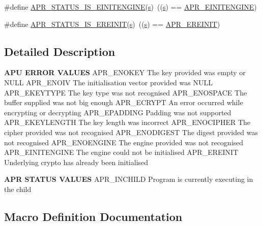 \begin{DoxyCompactItemize}
\item 
\#define \hyperlink{group__APR__Util__Error_ga0330ff3219d56b41f702364de38d2a18}{A\+P\+R\+\_\+\+S\+T\+A\+T\+U\+S\+\_\+\+I\+S\+\_\+\+E\+I\+N\+I\+T\+E\+N\+G\+I\+NE}(\hyperlink{pcretest_8txt_a062597889ba244b72877454b1d3adecf}{s})~((\hyperlink{pcretest_8txt_a062597889ba244b72877454b1d3adecf}{s}) == \hyperlink{group__APR__Util__Error_ga9d8482ae4b93bdce0f31f120c0511550}{A\+P\+R\+\_\+\+E\+I\+N\+I\+T\+E\+N\+G\+I\+NE})
\item 
\#define \hyperlink{group__APR__Util__Error_ga234e5a708e8d01eb781b4d96f0cc7b05}{A\+P\+R\+\_\+\+S\+T\+A\+T\+U\+S\+\_\+\+I\+S\+\_\+\+E\+R\+E\+I\+N\+IT}(\hyperlink{pcretest_8txt_a062597889ba244b72877454b1d3adecf}{s})~((\hyperlink{pcretest_8txt_a062597889ba244b72877454b1d3adecf}{s}) == \hyperlink{group__APR__Util__Error_ga161b8a0f8e24033e8cd5d9068d524f00}{A\+P\+R\+\_\+\+E\+R\+E\+I\+N\+IT})
\end{DoxyCompactItemize}


\subsection{Detailed Description}

\begin{DoxyPre}
{\bfseries APU ERROR VALUES}
APR\_ENOKEY         The key provided was empty or NULL
APR\_ENOIV          The initialisation vector provided was NULL
APR\_EKEYTYPE       The key type was not recognised
APR\_ENOSPACE       The buffer supplied was not big enough
APR\_ECRYPT         An error occurred while encrypting or decrypting
APR\_EPADDING       Padding was not supported
APR\_EKEYLENGTH     The key length was incorrect
APR\_ENOCIPHER      The cipher provided was not recognised
APR\_ENODIGEST      The digest provided was not recognised
APR\_ENOENGINE      The engine provided was not recognised
APR\_EINITENGINE    The engine could not be initialised
APR\_EREINIT        Underlying crypto has already been initialised
\end{DoxyPre}



\begin{DoxyPre}
{\bfseries APR STATUS VALUES}
APR\_INCHILD        Program is currently executing in the child
\end{DoxyPre}
 

\subsection{Macro Definition Documentation}
